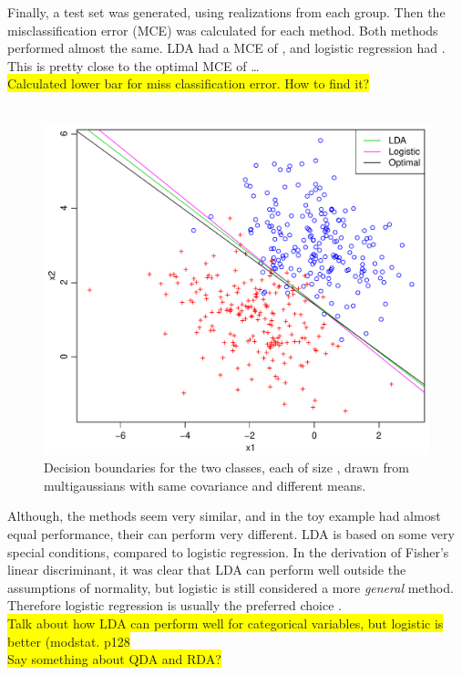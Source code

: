 Finally, a test set was generated, using  realizations from each group. Then the misclassification error (MCE) was calculated for each method.  Both methods performed almost the same. LDA had a MCE of , and logistic regression had . This is pretty close to the optimal MCE of \ldots {} \\
\colorbox{yellow}{Calculated lower bar for miss classification error. How to find it?}\\
\\
%
\begin{figure}[h!]
\begin{center}
    \includegraphics[scale=0.5]{./figures/ldaVsLogistic.pdf}
\end{center}
\caption{Decision boundaries for the two classes, each of size , drawn from multigaussians with same covariance and different means.}
\label{fig:ldaVsLogistic}
\end{figure}
%
Although, the methods seem very similar, and in the toy example had almost equal performance, their can perform very different. LDA is based on some very special conditions, compared to logistic regression. In the derivation of Fisher's linear discriminant, it was clear that LDA can perform well outside the assumptions of normality, but logistic is still considered a more \textit{general} method. Therefore logistic regression is usually the preferred choice \cite[p.~128]{modstat}.
\\\colorbox{yellow}{Talk about how LDA can perform well for categorical variables, but logistic is better (modstat. p128}\\
\colorbox{yellow}{Say something about QDA and RDA?}\\
